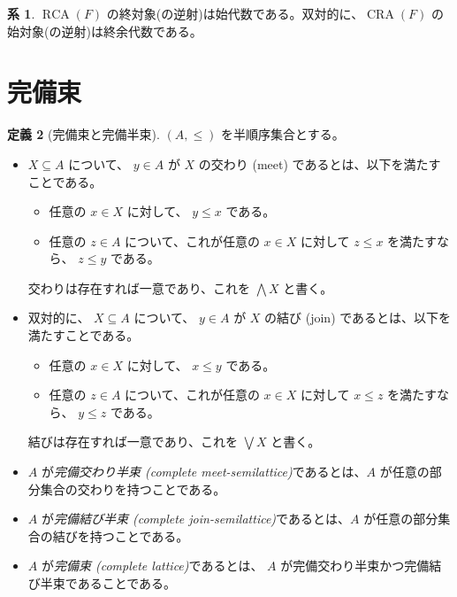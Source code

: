 \documentclass[dvipdfmx,uplatex,papersize,a4paper,10pt]{jsarticle}
\theoremstyle{definition}
\newtheorem{definition}{定義}[section]
\newtheorem{corollary}[definition]{系}
\DeclareMathOperator{\RCA}{RCA}
\DeclareMathOperator{\CRA}{CRA}
\begin{document}
\begin{corollary}
  $\RCA(F)$ の終対象(の逆射)は始代数である。双対的に、$\CRA(F)$ の始対象(の逆射)は終余代数である。
\end{corollary}

\section{完備束}

\begin{definition}[完備束と完備半束]
  $(A, \leq)$ を半順序集合とする。

  \begin{itemize}
    \item $X \subseteq A$ について、 $y \in A$ が $X$ の交わり (meet) であるとは、以下を満たすことである。
      \begin{itemize}
        \item 任意の $x \in X$ に対して、 $y \leq x$ である。
        \item 任意の $z \in A$ について、これが任意の $x \in X$ に対して $z \leq x$ を満たすなら、 $z \leq y$ である。
      \end{itemize}

      交わりは存在すれば一意であり、これを $\bigwedge X$ と書く。

    \item 双対的に、 $X \subseteq A$ について、 $y \in A$ が $X$ の結び (join) であるとは、以下を満たすことである。
      \begin{itemize}
        \item 任意の $x \in X$ に対して、 $x \leq y$ である。
        \item 任意の $z \in A$ について、これが任意の $x \in X$ に対して $x \leq z$ を満たすなら、 $y \leq z$ である。
      \end{itemize}

      結びは存在すれば一意であり、これを $\bigvee X$ と書く。

    \item $A$ が\emph{完備交わり半束 (complete meet-semilattice)}であるとは、$A$ が任意の部分集合の交わりを持つことである。
    \item $A$ が\emph{完備結び半束 (complete join-semilattice)}であるとは、$A$ が任意の部分集合の結びを持つことである。
    \item $A$ が\emph{完備束 (complete lattice)}であるとは、 $A$ が完備交わり半束かつ完備結び半束であることである。
  \end{itemize}
\end{definition}
\end{document}
